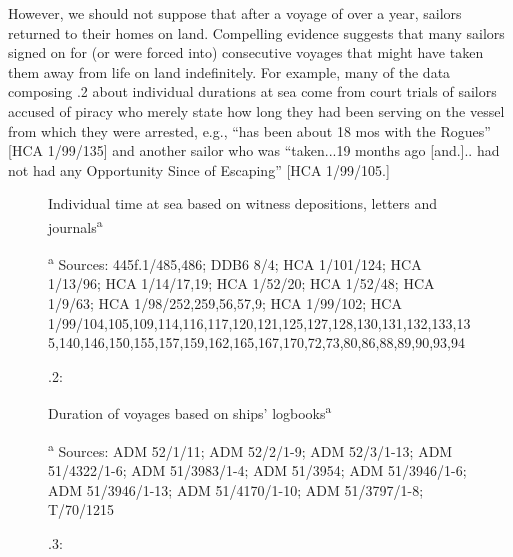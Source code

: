 However, we should not suppose that after a voyage of over a year, sailors returned to their homes on land. Compelling evidence suggests that many sailors signed on for (or were forced into) consecutive voyages that might have taken them away from life on land indefinitely. For example, many of the data composing .2 about individual durations at sea come from court trials of sailors accused of piracy who merely state how long they had been serving on the vessel from which they were arrested, e.g., “has been about 18 mos with the Rogues” [HCA 1/99/135] and another sailor who was “taken...19 months ago [and.].. had not had any Opportunity Since of Escaping” [HCA 1/99/105.]


\begin{figure}
  
 

\caption{\label{fig:key:4}.2:} Individual time at sea based on witness depositions, letters and journals\textsuperscript{a} 

\textsuperscript{a} Sources: 445f.1/485,486; DDB6 8/4; HCA 1/101/124; HCA 1/13/96; HCA 1/14/17,19; HCA 1/52/20; HCA 1/52/48; HCA 1/9/63; HCA 1/98/252,259,56,57,9; HCA 1/99/102; HCA 1/99/104,105,109,114,116,117,120,121,125,127,128,130,131,132,133,135,140,146,150,155,157,159,162,165,167,170,72,73,80,86,88,89,90,93,94
\end{figure}


\begin{figure}
  
 

\caption{\label{fig:key:4}.3:} Duration of voyages based on ships’ logbooks\textsuperscript{a}

\textsuperscript{a} Sources: ADM 52/1/11; ADM 52/2/1-9; ADM 52/3/1-13; ADM 51/4322/1-6; ADM 51/3983/1-4; ADM 51/3954; ADM 51/3946/1-6; ADM 51/3946/1-13; ADM 51/4170/1-10; ADM 51/3797/1-8; T/70/1215
\end{figure}


